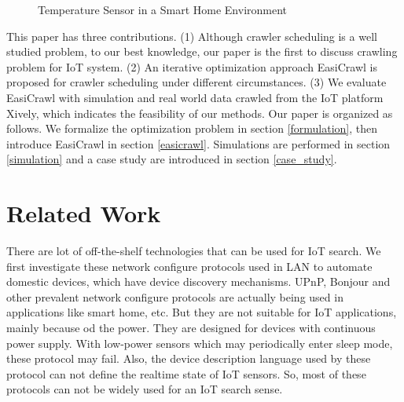 \documentclass[conference]{IEEEtran}
\begin{document}
\begin{figure}
	\centering
	\hspace{-3.0em}
	
	\captionsetup{justification=centering}
	\caption{Temperature Sensor in a Smart Home Environment}
	\vspace{-1.0em}
	\label{fig:smarthome}
\end{figure}

This paper has three contributions.
(1) Although crawler scheduling is a well studied problem, to our best knowledge, our paper is the first to discuss crawling problem for IoT system.
(2) An iterative optimization approach EasiCrawl is proposed for crawler scheduling under different circumstances.
(3) We evaluate EasiCrawl with simulation and real world data crawled from the IoT platform Xively\cite{xively}, which indicates the feasibility of our methods.
Our paper is organized as follows. 
We formalize the optimization problem in section \ref{formulation}, then introduce EasiCrawl in section \ref{easicrawl}. Simulations are performed in section \ref{simulation} and a case study are introduced in section \ref{case_study}. 

\section{Related Work}\label{related_work}

There are lot of off-the-shelf technologies that can be used for IoT search.
We first investigate these network configure protocols used in LAN to automate domestic devices, which have device discovery mechanisms.
UPnP\cite{UPnP}, Bonjour\cite{Bonjour} and other prevalent network configure protocols are actually being used in applications like smart home, etc.
But they are not suitable for IoT applications, mainly because od the power. They are designed for devices with continuous power supply. With low-power sensors which may periodically enter sleep mode, these protocol may fail.
Also, the device description language used by these protocol can not define the realtime state of IoT sensors. So, most of these protocols can not be widely used for an IoT search sense.
\end{document}
